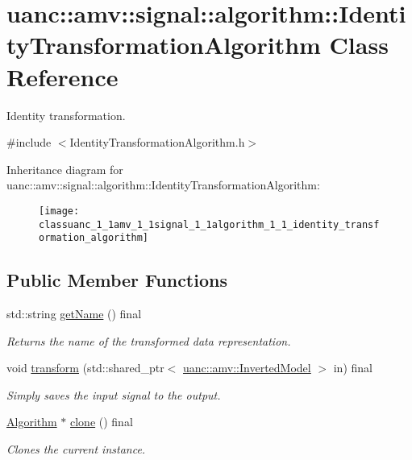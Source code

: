 \hypertarget{classuanc_1_1amv_1_1signal_1_1algorithm_1_1_identity_transformation_algorithm}{}\section{uanc\+:\+:amv\+:\+:signal\+:\+:algorithm\+:\+:Identity\+Transformation\+Algorithm Class Reference}
\label{classuanc_1_1amv_1_1signal_1_1algorithm_1_1_identity_transformation_algorithm}


Identity transformation.  




{\ttfamily \#include $<$Identity\+Transformation\+Algorithm.\+h$>$}

Inheritance diagram for uanc\+:\+:amv\+:\+:signal\+:\+:algorithm\+:\+:Identity\+Transformation\+Algorithm\+:\begin{figure}[H]
\begin{center}
\leavevmode
\texttt{[image: classuanc\_1\_1amv\_1\_1signal\_1\_1algorithm\_1\_1\_identity\_transformation\_algorithm]}
\end{center}
\end{figure}
\subsection*{Public Member Functions}
\begin{DoxyCompactItemize}
\item 
std\+::string \hyperlink{classuanc_1_1amv_1_1signal_1_1algorithm_1_1_identity_transformation_algorithm_ad79e871df8798749358bd3f64cd6a4f1}{get\+Name} () final
\begin{DoxyCompactList}\small\item\em Returns the name of the transformed data representation. \end{DoxyCompactList}\item 
void \hyperlink{classuanc_1_1amv_1_1signal_1_1algorithm_1_1_identity_transformation_algorithm_aac5f7f10ab44d7f8625eb5dbb72e5c44}{transform} (std\+::shared\+\_\+ptr$<$ \hyperlink{classuanc_1_1amv_1_1_inverted_model}{uanc\+::amv\+::\+Inverted\+Model} $>$ in) final
\begin{DoxyCompactList}\small\item\em Simply saves the input signal to the output. \end{DoxyCompactList}\item 
\hyperlink{classuanc_1_1amv_1_1_algorithm}{Algorithm} $\ast$ \hyperlink{classuanc_1_1amv_1_1signal_1_1algorithm_1_1_identity_transformation_algorithm_a863e785131c7e4f7d41d403a7fb4526d}{clone} () final
\begin{DoxyCompactList}\small\item\em Clones the current instance. \end{DoxyCompactList}\end{DoxyCompactItemize}
